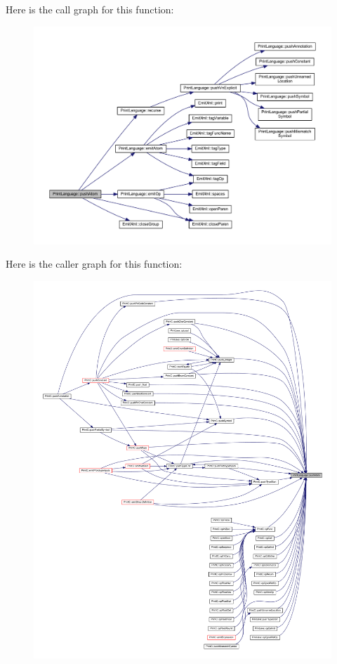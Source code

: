 Here is the call graph for this function\+:
\nopagebreak
\begin{figure}[H]
\begin{center}
\leavevmode
\includegraphics[width=350pt]{class_print_language_abeb8a9774fbf1dcb700be292a7e10be8_cgraph}
\end{center}
\end{figure}
Here is the caller graph for this function\+:
\nopagebreak
\begin{figure}[H]
\begin{center}
\leavevmode
\includegraphics[width=350pt]{class_print_language_abeb8a9774fbf1dcb700be292a7e10be8_icgraph}
\end{center}
\end{figure}
\mbox{\label{class_print_language_a1ef3fe4265a8f0abdb72f90ce3cb9944}} 
